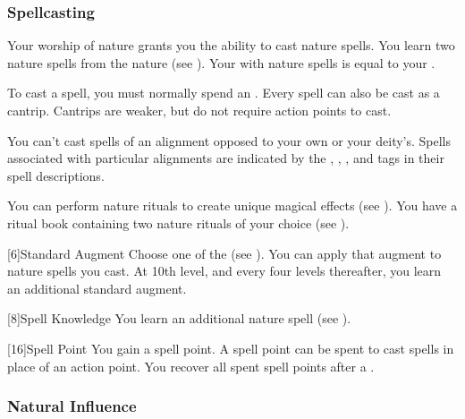         \subsubsection{Spellcasting}

            Your worship of nature grants you the ability to cast nature spells.
            You learn two nature spells from the nature  (see ).
            Your  with nature spells is equal to your .

            To cast a spell, you must normally spend an .
            Every spell can also be cast as a cantrip.
            Cantrips are weaker, but do not require action points to cast.

            You can't cast spells of an alignment opposed to your own or your deity's.
            Spells associated with particular alignments are indicated by the , , , and  tags in their spell descriptions.

            You can perform nature rituals to create unique magical effects (see ).
            You have a ritual book containing two nature rituals of your choice (see ).

            [6]{Standard Augment}
            Choose one of the  (see ).
            You can apply that augment to nature spells you cast.
            At 10th level, and every four levels thereafter, you learn an additional standard augment.

            [8]{Spell Knowledge}
            You learn an additional nature spell (see ).

            [16]{Spell Point} 
            You gain a spell point.
            A spell point can be spent to cast spells in place of an action point.
            You recover all spent spell points after a .

        \subsubsection{Natural Influence}

